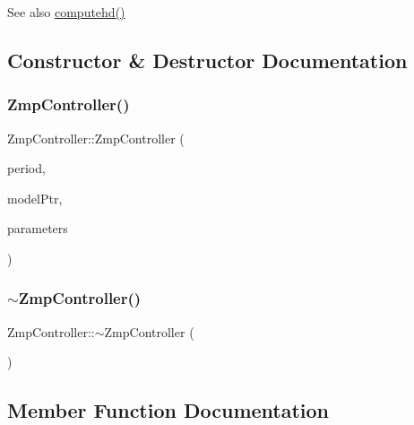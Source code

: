 \begin{DoxySeeAlso}{See also}
\hyperlink{classZmpController_a5eab881a51fb2ace1a1d494171353bc7}{computehd()} 
\end{DoxySeeAlso}


\subsection{Constructor \& Destructor Documentation}
\hypertarget{classZmpController_a4c47608f6d62b6b490808816879c01b7}{}\label{classZmpController_a4c47608f6d62b6b490808816879c01b7} 
\subsubsection{\texorpdfstring{Zmp\+Controller()}{ZmpController()}}
{\footnotesize\ttfamily Zmp\+Controller\+::\+Zmp\+Controller (\begin{DoxyParamCaption}\item[{const int}]{period,  }\item[{std\+::shared\+\_\+ptr$<$ ocra\+::\+Model $>$}]{model\+Ptr,  }\item[{std\+::shared\+\_\+ptr$<$ \hyperlink{structZmpControllerParams}{Zmp\+Controller\+Params} $>$}]{parameters }\end{DoxyParamCaption})}

\hypertarget{classZmpController_af308a70e70cfe9a1e9569606da8b1739}{}\label{classZmpController_af308a70e70cfe9a1e9569606da8b1739} 
\subsubsection{\texorpdfstring{$\sim$\+Zmp\+Controller()}{~ZmpController()}}
{\footnotesize\ttfamily Zmp\+Controller\+::$\sim$\+Zmp\+Controller (\begin{DoxyParamCaption}{ }\end{DoxyParamCaption})\hspace{0.3cm}{\ttfamily [virtual]}}



\subsection{Member Function Documentation}
\hypertarget{classZmpController_a6fd41771d83a31bd190f4031f82649e0}{}\label{classZmpController_a6fd41771d83a31bd190f4031f82649e0} 

